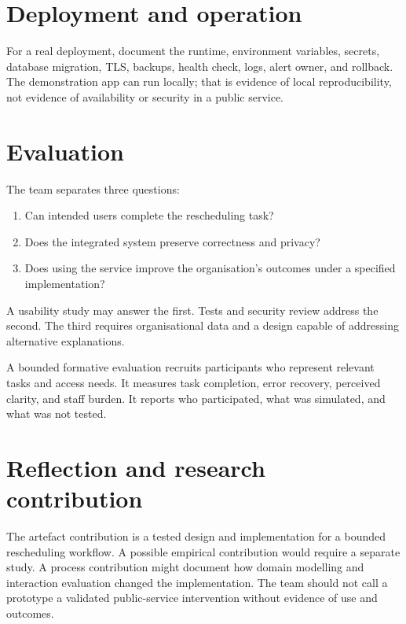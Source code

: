 \section{Deployment and operation}
For a real deployment, document the runtime, environment variables, secrets, database migration, TLS, backups, health check, logs, alert owner, and rollback. The demonstration app can run locally; that is evidence of local reproducibility, not evidence of availability or security in a public service.

\section{Evaluation}
The team separates three questions:
\begin{enumerate}
\item Can intended users complete the rescheduling task?
\item Does the integrated system preserve correctness and privacy?
\item Does using the service improve the organisation's outcomes under a specified implementation?
\end{enumerate}
A usability study may answer the first. Tests and security review address the second. The third requires organisational data and a design capable of addressing alternative explanations.

A bounded formative evaluation recruits participants who represent relevant tasks and access needs. It measures task completion, error recovery, perceived clarity, and staff burden. It reports who participated, what was simulated, and what was not tested.

\section{Reflection and research contribution}
The artefact contribution is a tested design and implementation for a bounded rescheduling workflow. A possible empirical contribution would require a separate study. A process contribution might document how domain modelling and interaction evaluation changed the implementation. The team should not call a prototype a validated public-service intervention without evidence of use and outcomes.

